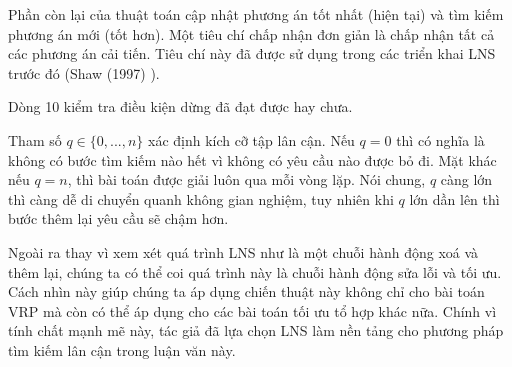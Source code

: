 Phần còn lại của thuật toán cập nhật phương án tốt nhất (hiện tại) và tìm kiếm phương án mới (tốt hơn). Một tiêu chí chấp nhận đơn giản là chấp nhận tất cả các phương án cải tiến. Tiêu chí này đã được sử dụng trong các triển khai LNS trước đó (Shaw (1997) \cite{shaw1997new}).

Dòng 10 kiểm tra điều kiện dừng đã đạt được hay chưa.

Tham số $q \in \{0,...,n\}$ xác định kích cỡ tập lân cận. Nếu $q = 0$ thì có nghĩa là không có bước tìm kiếm nào hết vì không có yêu cầu nào được bỏ đi. Mặt khác nếu $q = n$, thì bài toán được giải luôn qua mỗi vòng lặp. Nói chung, $q$ càng lớn thì càng dễ di chuyển quanh không gian nghiệm, tuy nhiên khi $q$ lớn dần lên thì bước thêm lại yêu cầu sẽ chậm hơn. 

Ngoài ra thay vì xem xét quá trình LNS như là một chuỗi hành động xoá và thêm lại, chúng ta có thể coi quá trình này là chuỗi hành động sửa lỗi và tối ưu. Cách nhìn này giúp chúng ta áp dụng chiến thuật này không chỉ cho bài toán VRP mà còn có thể áp dụng cho các bài toán tối ưu tổ hợp khác nữa. Chính vì tính chất mạnh mẽ này, tác giả đã lựa chọn LNS làm nền tảng cho phương pháp tìm kiếm lân cận trong luận văn này.




